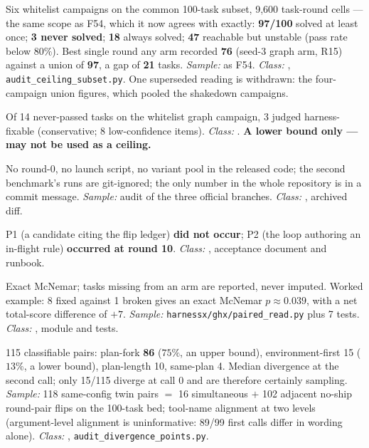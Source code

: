 \begin{description}[leftmargin=0pt,labelindent=0pt,labelsep=0pt,style=nextline,font=\normalfont,itemsep=6pt]
\item[\textbf{F16}\quad Reachability and reliability ceilings.]
Six whitelist campaigns on the common 100-task subset, 9{,}600 task-round
cells --- the same scope as F54, which it now agrees with exactly:
\textbf{97/100} solved at least once; \textbf{3 never solved};
\textbf{18} always solved; \textbf{47} reachable but unstable (pass rate
below $80\%$). Best single round any arm recorded \textbf{76}
(seed-3 graph arm, R15) against a union of \textbf{97}, a gap of
\textbf{21} tasks. \emph{Sample:} as F54. \emph{Class:} ,
\texttt{audit\_ceiling\_subset.py}. One superseded reading is withdrawn:
the four-campaign union figures, which pooled the shakedown campaigns.

\item[\textbf{F17}\quad Reading of the never-passed queue.]
Of 14 never-passed tasks on the whitelist graph campaign, 3 judged
harness-fixable (conservative; 8 low-confidence items).
\emph{Class:} . \textbf{A lower bound only --- may not be used as a
ceiling.}

\item[\textbf{F19}\quad The official system publishes no numbers.]
No round-0, no launch script, no variant pool in the released code; the
second benchmark's runs are git-ignored; the only number in the whole
repository is in a commit message. \emph{Sample:} audit of the three
official branches. \emph{Class:} , archived diff.

\item[\textbf{F20}\quad Pre-specified predictions, adjudicated.]
P1 (a candidate citing the flip ledger) \textbf{did not occur};
P2 (the loop authoring an in-flight rule) \textbf{occurred at round 10}.
\emph{Class:} , acceptance document and runbook.

\item[\textbf{F21}\quad The paired-reading module.]
Exact McNemar; tasks missing from an arm are reported, never imputed.
Worked example: 8 fixed against 1 broken gives an exact McNemar
$p \approx 0.039$, with a net total-score difference of $+7$. \emph{Sample:}
\texttt{harnessx/ghx/paired\_read.py} plus 7 tests. \emph{Class:} ,
module and tests.

\item[\textbf{F22}\quad Twin divergence taxonomy.]
115 classifiable pairs: plan-fork \textbf{86} ($75\%$, an upper bound),
environment-first 15 ($13\%$, a lower bound), plan-length 10, same-plan 4.
Median divergence at the second call; only 15/115 diverge at call 0 and are
therefore certainly sampling. \emph{Sample:} 118 same-config twin pairs
$=$ 16 simultaneous $+$ 102 adjacent no-ship round-pair flips on the
100-task bed; tool-name alignment at two levels (argument-level alignment
is uninformative: 89/99 first calls differ in wording alone). \emph{Class:}
, \texttt{audit\_divergence\_points.py}.


\end{description}
